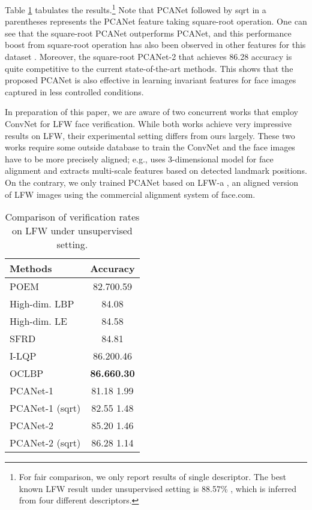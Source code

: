 \documentclass[10pt,journal,compsoc]{IEEEtran}
\begin{document}
{
Table \ref{table: LFW} tabulates the results.\footnote{For fair comparison, we only report results of single descriptor. The best known LFW result under unsupervised setting is 88.57\% \cite{Barkan2013}, which is inferred from four different descriptors. } Note that PCANet followed by sqrt in a parentheses represents the PCANet feature taking square-root operation. One can see that the square-root PCANet outperforms PCANet, and this performance boost from square-root operation has also been observed in other features for this dataset \cite{Barkan2013}. Moreover, the square-root PCANet-2 that achieves 86.28 accuracy is quite competitive to the current state-of-the-art methods.
This shows that the proposed PCANet is also effective in learning invariant features for face images captured in less controlled conditions.

In preparation of this paper, we are aware of two concurrent works \cite{Taigman2014, Fan2014} that employ ConvNet for LFW face verification. While both works achieve very impressive results on LFW, their experimental setting differs from ours largely. These two works require some outside database to train the ConvNet and the face images have to be more precisely aligned; e.g., \cite{Taigman2014} uses 3-dimensional model for face alignment and \cite{Fan2014} extracts multi-scale features based on detected landmark positions. On the contrary, we only trained PCANet based on LFW-a  \cite{Wolf2011}, an aligned version of LFW images using the commercial alignment system of face.com. }


\begin{table}[htbp]\centering
\caption{Comparison of verification rates  on LFW under unsupervised setting.}
\begin{tabular}{l|c}
  \hline
Methods           & Accuracy \\  \hline \hline
  POEM \cite{Vu2012}  & 82.700.59 \\
  High-dim. LBP \cite{Chen2013}  & 84.08 \\
  High-dim. LE \cite{Chen2013}  & 84.58 \\
  SFRD \cite{Cui2013}  & 84.81  \\
  I-LQP \cite{Hussain2012} & 86.200.46 \\
  OCLBP \cite{Barkan2013} & {\bf 86.660.30} \\  \hline
PCANet-1  & 81.18  1.99  \\
  PCANet-1 ({\rm sqrt})  & 82.55  1.48  \\
  PCANet-2  & 85.20  1.46  \\
  PCANet-2 ({\rm sqrt}) & 86.28  1.14  \\
  \hline
\end{tabular}\label{table: LFW}
\end{table}
\end{document}
